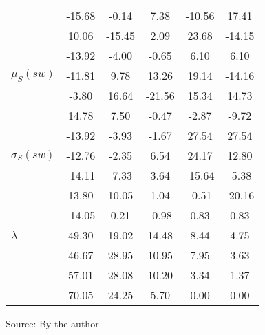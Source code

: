 \begin{table}[h!]
\begin{center}
\begin{tabular}{| l || c | c | c | c | c |}
 & -15.68  & -0.14  & 7.38  & -10.56  & 17.41 \\
 & 10.06  & -15.45  & 2.09  & 23.68  & -14.15 \\
 & -13.92  & -4.00  & -0.65  & 6.10  & 6.10 \\\hline
$\mu_S(sw)$ & -11.81  & 9.78  & 13.26  & 19.14  & -14.16 \\
 & -3.80  & 16.64  & -21.56  & 15.34  & 14.73 \\
 & 14.78  & 7.50  & -0.47  & -2.87  & -9.72 \\
 & -13.92  & -3.93  & -1.67  & 27.54  & 27.54 \\\hline
$\sigma_S(sw)$ & -12.76  & -2.35  & 6.54  & 24.17  & 12.80 \\
 & -14.11  & -7.33  & 3.64  & -15.64  & -5.38 \\
 & 13.80  & 10.05  & 1.04  & -0.51  & -20.16 \\
 & -14.05  & 0.21  & -0.98  & 0.83  & 0.83 \\\hline\hline
$\lambda$ & 49.30  & 19.02  & 14.48  & 8.44  & 4.75 \\
 & 46.67  & 28.95  & 10.95  & 7.95  & 3.63 \\
 & 57.01  & 28.08  & 10.20  & 3.34  & 1.37 \\
 & 70.05  & 24.25  & 5.70  & 0.00  & 0.00 \\\hline
\end{tabular}
\begin{flushleft}
		Source: By the author.\
\end{flushleft}
\end{center}
\end{table}
